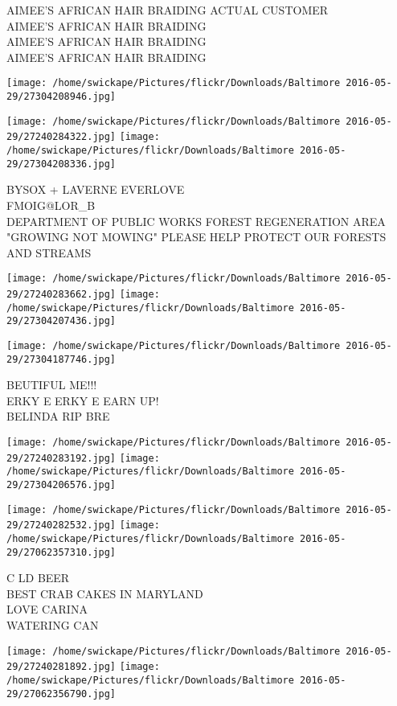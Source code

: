 \documentclass[10pt,letterpaper]{article}
\begin{document}
AIMEE'S AFRICAN HAIR BRAIDING ACTUAL CUSTOMER\\
AIMEE'S AFRICAN HAIR BRAIDING\\
AIMEE'S AFRICAN HAIR BRAIDING\\
AIMEE'S AFRICAN HAIR BRAIDING
\pagebreak

\texttt{[image: /home/swickape/Pictures/flickr/Downloads/Baltimore 2016-05-29/27304208946.jpg]}

\vspace{0.25in}
\texttt{[image: /home/swickape/Pictures/flickr/Downloads/Baltimore 2016-05-29/27240284322.jpg]}
\texttt{[image: /home/swickape/Pictures/flickr/Downloads/Baltimore 2016-05-29/27304208336.jpg]}

BYSOX + LAVERNE EVERLOVE\\
FMOIG@LOR\_B\\
DEPARTMENT OF PUBLIC WORKS FOREST REGENERATION AREA "GROWING NOT MOWING" PLEASE HELP PROTECT OUR FORESTS AND STREAMS
\pagebreak

\texttt{[image: /home/swickape/Pictures/flickr/Downloads/Baltimore 2016-05-29/27240283662.jpg]}
\texttt{[image: /home/swickape/Pictures/flickr/Downloads/Baltimore 2016-05-29/27304207436.jpg]}

\vspace{0.25in}
\texttt{[image: /home/swickape/Pictures/flickr/Downloads/Baltimore 2016-05-29/27304187746.jpg]}

BEUTIFUL ME!!!\\
ERKY E ERKY E EARN UP!\\
BELINDA RIP BRE
\pagebreak

\texttt{[image: /home/swickape/Pictures/flickr/Downloads/Baltimore 2016-05-29/27240283192.jpg]}
\texttt{[image: /home/swickape/Pictures/flickr/Downloads/Baltimore 2016-05-29/27304206576.jpg]}

\texttt{[image: /home/swickape/Pictures/flickr/Downloads/Baltimore 2016-05-29/27240282532.jpg]}
\texttt{[image: /home/swickape/Pictures/flickr/Downloads/Baltimore 2016-05-29/27062357310.jpg]}

C LD BEER\\
BEST CRAB CAKES IN MARYLAND\\
LOVE CARINA\\
WATERING CAN
\pagebreak

\texttt{[image: /home/swickape/Pictures/flickr/Downloads/Baltimore 2016-05-29/27240281892.jpg]}
\texttt{[image: /home/swickape/Pictures/flickr/Downloads/Baltimore 2016-05-29/27062356790.jpg]}
\end{document}

